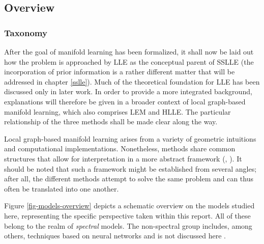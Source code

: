 \subsection{Overview}
\label{principles-overview}


\subsubsection{Taxonomy}
\label{taxonomy}

After the goal of manifold learning has been formalized, it shall now be laid 
out how the problem is approached by LLE as the conceptual parent of SSLLE 
(the incorporation of prior information is a rather different matter that will 
be addressed in chapter \ref{sslle}). 
Much of the theoretical foundation for LLE has been discussed only in later 
work.
In order to provide a more integrated background, explanations will therefore be 
given in a broader context of local graph-based manifold learning, which also 
comprises LEM and HLLE.
The particular relationship of the three methods shall be made clear along the 
way.

Local graph-based manifold learning arises from a variety of geometric 
intuitions and computational implementations.
Nonetheless, methods share common structures that allow for interpretation in a 
more abstract framework (\citet{bengioetal2003}, \citet{bengioetal2004}).
It should be noted that such a framework might be established from several 
angles; after all, the different methods attempt to solve the same problem 
and can thus often be translated into one another.

Figure \ref{fig-models-overview} depicts a schematic overview on the models 
studied here, representing the specific perspective taken within this report.
All of these belong to the realm of \textit{spectral} models.
The non-spectral group includes, among others, techniques based on neural 
networks and is not discussed here \citep{vandermaatenetal2009}.

